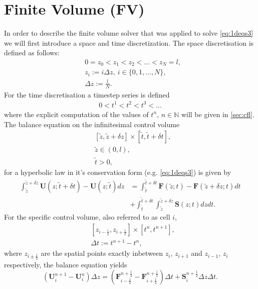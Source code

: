 \documentclass[a4paper, oneside]{discothesis}
\begin{document}
\section{Finite Volume (FV)} 
In order to describe the finite volume solver that was applied to solve \autoref{eq:1deqs3} we will first introduce a space and time discretization.
The space discretisation is defined as follows:
\begin{align}
	&0 = z_0 < z_1 < z_2 < ... < z_N = l, \\
	&z_i :=  i \Delta z,\ i \in \{0,1,...,N\} , \\
	&\Delta z := \frac{l}{N}.
\end{align}
For the time discretisation a timestep series is defined
\begin{align}
	0 < t^1 < t^2 < t^3 < ...
\end{align}
where the explicit computation of the values of $t^n$, $n \in \mathbb{N}$  will be given in \autoref{sec:cfl}.
The balance equation on the infinitesimal control volume 
\begin{align}
	&[\tilde{z}, \tilde{z} + \delta z] \times [\tilde{t}, \tilde{t} + \delta t], \\
	&\tilde{z} \in (0,l), \\
	&\tilde{t} > 0,
\end{align}
for a hyperbolic law in it's conservation form (e.g. \autoref{eq:1deqs3}) is given by
\begin{align}
	\int_{\tilde{z}}^{\tilde{z} + \delta z} \mathbf{U} (z; \tilde{t} + \delta t) - \mathbf{U} (z;\tilde{t}) dz &= \int_{\tilde{t}}^{\tilde{t}+\delta t} \mathbf{F}(\tilde{z};t) - \mathbf{F}(\tilde{z} + \delta z; t) dt\\
																											   &+ \int_{\tilde{t}}^{\tilde{t} + \delta t} \int_{\tilde{z}}^{\tilde{z} + \delta z}  \mathbf{S}(z;t) dzdt.
\end{align}
For the specific control volume, also referred to as cell $i$,
\begin{align}
	&[z_{i-\frac{1}{2}},z_{i+\frac{1}{2}}] \times [t^n, t^{n+1}], \\
	&\Delta t := t^{n+1}-t^n,
\end{align}
where $z_{i \pm \frac{1}{2}}$ are the spatial points exactly inbetween $z_{i}$, $z_{i+1}$ and $z_{i-1}$, $z_{i}$ respectively, the balance equation yields
\begin{equation}
	(\mathbf{U} _i^{n+1}-\mathbf{U} _i^n) \Delta z = (\mathbf{F}_{i-\frac{1}{2}}^{n+\frac{1}{2}} - \mathbf{F}_{i+\frac{1}{2}}^{n+\frac{1}{2}}) \Delta t + \mathbf{S}_i^{n+\frac{1}{2}} \Delta z \Delta t.
\end{equation}
\end{document}
